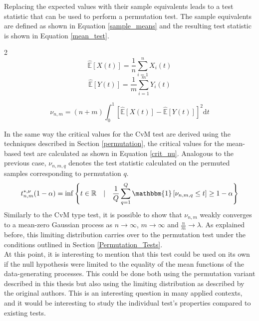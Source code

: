 \documentclass[12pt, a4paper]{article}
\theoremstyle{MAstyle} \newtheorem{assumption}{Assumption}[section]
\theoremstyle{MAstyle} \newtheorem{definition}{Definition}[section]
\theoremstyle{MAstyle} \newtheorem{theorem}{Theorem}[section]
\begin{document}
			Replacing the expected values with their sample equivalents leads to a test statistic that can be used to perform a permutation test. The sample equivalents are defined as shown in Equation \ref{sample_means} and the resulting test statistic is shown in Equation \ref{mean_test}.
			\begin{multicols}{2}
				\noindent
				\begin{equation*}
					\hat{\mathbb{E}}\left[X(t)\right] = \frac{1}{n}\sum_{i = 1}^{n} X_i(t)
				\end{equation*}
				\begin{equation}\label{sample_means}
					\hat{\mathbb{E}}\left[Y(t)\right] = \frac{1}{m}\sum_{i = 1}^{m} Y_i(t)
				\end{equation}
			\end{multicols}
			\begin{equation}\label{mean_test}
				\nu_{n,m} = (n+m) \int_{0}^{1} \left[\hat{\mathbb{E}}\left[X(t)\right] - \hat{\mathbb{E}}\left[Y(t)\right] \right]^2 \mathrm{d}t
			\end{equation}
		
			In the same way the critical values for the CvM test are derived using the techniques described in Section \ref{permutation}, the critical values for the mean-based test are calculated as shown in Equation \ref{crit_nu}. Analogous to the previous case, $\nu_{n,m,q}$ denotes the test statistic  calculated on the permuted samples corresponding to permutation $q$.
			\begin{equation}\label{crit_nu}
				t^{*, \nu}_{n,m}(1-\alpha) = \inf \left\{t \in \mathbb{R} \quad \vert \quad \frac{1}{Q} \sum_{q = 1}^{Q} \mathbbm{1}\left[\nu_{n,m,q} \leq t\right] \geq 1 - \alpha \right\}
			\end{equation}
			Similarly to the CvM type test, it is possible to show that $\nu_{n,m}$ weakly converges to a mean-zero Gaussian process as $n \rightarrow \infty$, $m \rightarrow \infty$ and $\frac{n}{m} \rightarrow \lambda$. As explained before, this limiting distribution carries over to the permutation test under the conditions outlined in Section \ref{Permutation_Tests}.\\
			
			At this point, it is interesting to mention that this test could be used on its own if the null hypothesis were limited to the equality of the mean functions of the data-generating processes. 
			This could be done both using the permutation variant described in this thesis but also using the limiting distribution as described by the original authors.
			This is an interesting question in many applied contexts, and it would be interesting to study the individual test's properties compared to existing tests.
\end{document}
